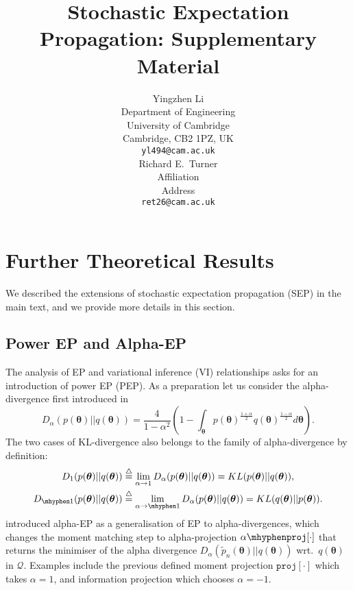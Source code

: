 \documentclass{article} %
\title{Stochastic Expectation Propagation: Supplementary Material}
\author{
Yingzhen Li \\
Department of Engineering\\
University of Cambridge\\
Cambridge, CB2 1PZ, UK \\
\texttt{yl494@cam.ac.uk} \\
\And
Richard E.~Turner \\
Affiliation \\
Address \\
\texttt{ret26@cam.ac.uk} \\
}
\begin{document}
\maketitle

\appendix

\section{Further Theoretical Results}
We described the extensions of stochastic expectation propagation (SEP) in the main text, and we provide more details in this section.
\subsection{Power EP and Alpha-EP}
The analysis of EP and variational inference (VI) relationships asks for an introduction of power EP (PEP). As a preparation let us consider the alpha-divergence first introduced in \cite{amari:ig1985}
\begin{equation}
D_{\alpha}(p(\bm{\theta}) || q(\bm{\theta})) = \frac{4}{1 - \alpha^2} 
		\left( 1 - \int_{\bm{\theta}} p(\bm{\theta})^{ \frac{1+\alpha}{2}} q(\bm{\theta})^{ \frac{1- \alpha}{2}} d\bm{\theta} \right).
\end{equation} 
The two cases of KL-divergence also belongs to the family of alpha-divergence by definition:
\begin{align}
D_{1}(p(\bm{\theta})||q(\bm{\theta})) &\buildrel\triangle\over = \lim_{\alpha \rightarrow 1} D_{\alpha}(p(\bm{\theta})||q(\bm{\theta}))  = KL(p(\bm{\theta}) || q(\bm{\theta})), \\
D_{ \mhyphen 1}(p(\bm{\theta})||q(\bm{\theta})) &\buildrel\triangle\over = \lim_{\alpha \rightarrow \mhyphen 1} D_{\alpha}(p(\bm{\theta}) || q(\bm{\theta}))  = KL(q(\bm{\theta}) || p(\bm{\theta})).
\end{align}
\cite{minka:powerep} introduced alpha-EP as a generalisation of EP to alpha-divergences, which changes the moment matching step to alpha-projection $\alpha \mhyphen \mathtt{proj}[\cdot]$ \cite{amari:alpha_proj} that returns the minimiser of the alpha divergence $D_{\alpha}(\tilde{p}_n(\bm{\theta}) || q(\bm{\theta}))$ wrt.~$q(\bm{\theta})$ in $\mathcal{Q}$. Examples include the previous defined moment projection $\mathtt{proj}[\cdot]$ which takes $\alpha = 1$, and information projection which chooses $\alpha = -1$. 
\end{document}
